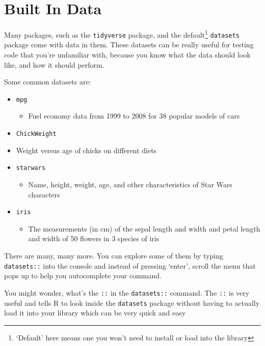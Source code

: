 \documentclass[
]{book}
\providecommand{\tightlist}{%
  \setlength{\itemsep}{0pt}\setlength{\parskip}{0pt}}
\begin{document}
\hypertarget{data_builtin}{%
\section{Built In Data}\label{data_builtin}}

Many packages, such as the \texttt{tidyverse} package, and the default\footnote{`Default' here means one you won't need to install or load into the library} \texttt{datasets} package come with data in them. These datasets can be really useful for testing code that you're unfamiliar with, because you know what the data should look like, and how it should perform.

Some common datasets are:

\begin{itemize}
\item
  \texttt{mpg}

  \begin{itemize}
  \tightlist
  \item
    Fuel economy data from 1999 to 2008 for 38 popular models of cars
  \end{itemize}
\item
  \texttt{ChickWeight}
\item
  Weight versus age of chicks on different diets
\item
  \texttt{starwars}

  \begin{itemize}
  \tightlist
  \item
    Name, height, weight, age, and other characteristics of Star Wars characters
  \end{itemize}
\item
  \texttt{iris}

  \begin{itemize}
  \tightlist
  \item
    The measurements (in cm) of the sepal length and width and petal length and width of 50 flowers in 3 species of iris
  \end{itemize}
\end{itemize}

There are many, many more. You can explore some of them by typing \texttt{datasets::} into the console and instead of pressing `enter', scroll the menu that pops up to help you autocomplete your command.

\begin{hey}
You might wonder, what's the \texttt{::} in the \texttt{datasets::}
command. The \texttt{::} is very useful and tells R to look inside the
\texttt{datasets} package without having to actually load it into your
library which can be very quick and easy
\end{hey}
\end{document}
